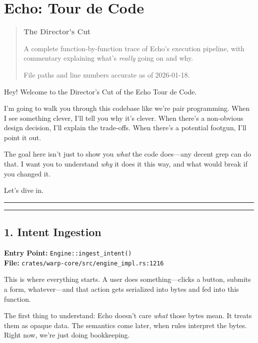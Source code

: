 \documentclass[11pt]{book}
\author{}
\date{}
\newenvironment{directors}
{\begin{mdframed}[
  linecolor=blue!60,
  linewidth=2pt,
  leftline=true,
  rightline=false,
  topline=false,
  bottomline=false,
  backgroundcolor=blue!3,
  innerleftmargin=12pt,
  innerrightmargin=10pt,
  innertopmargin=8pt,
  innerbottommargin=8pt,
  skipabove=12pt,
  skipbelow=12pt
]\small\sffamily\color{blue!70!black}}
{\end{mdframed}}
\begin{document}
\frontmatter

\mainmatter
\chapter*{Echo: Tour de Code}

\begin{quote}
\large\textbf{The Director's Cut}

\normalsize
A complete function-by-function trace of Echo's execution pipeline, with commentary explaining what's \emph{really} going on and why.

File paths and line numbers accurate as of 2026-01-18.
\end{quote}

\begin{directors}
Hey! Welcome to the Director's Cut of the Echo Tour de Code.

I'm going to walk you through this codebase like we're pair programming. When I see something clever, I'll tell you why it's clever. When there's a non-obvious design decision, I'll explain the trade-offs. When there's a potential footgun, I'll point it out.

The goal here isn't just to show you \emph{what} the code does---any decent grep can do that. I want you to understand \emph{why} it does it this way, and what would break if you changed it.

Let's dive in.
\end{directors}

\begin{center}\rule{0.5\linewidth}{0.5pt}\end{center}

\tableofcontents

\begin{center}\rule{0.5\linewidth}{0.5pt}\end{center}

\section{1. Intent Ingestion}\label{intent-ingestion}

\textbf{Entry Point:} \texttt{Engine::ingest\_intent()} \\
\textbf{File:} \texttt{crates/warp-core/src/engine\_impl.rs:1216}

\begin{directors}
This is where everything starts. A user does something---clicks a button, submits a form, whatever---and that action gets serialized into bytes and fed into this function.

The first thing to understand: Echo doesn't care \emph{what} those bytes mean. It treats them as opaque data. The semantics come later, when rules interpret the bytes. Right now, we're just doing bookkeeping.
\end{directors}
\end{document}

